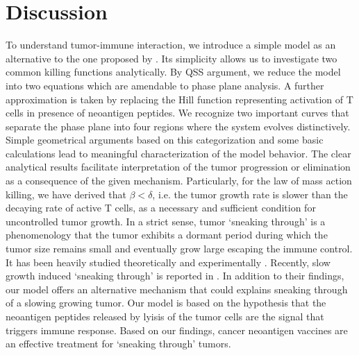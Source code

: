 \documentclass[review,authoryear]{elsarticle}
\begin{document}
\section{Discussion\label{sec:Discussion}}

To understand tumor-immune interaction, we introduce a simple model as
an alternative to the one proposed by \citet{Messan2021}. Its simplicity allows us to investigate two common killing functions analytically. By QSS argument,
we reduce the model into two equations which are amendable to phase
plane analysis. A further approximation is taken by replacing the
Hill function representing activation of T cells in presence of neoantigen
peptides. We recognize two important curves that separate the phase
plane into four regions where the system evolves distinctively. Simple
geometrical arguments based on this categorization and some basic
calculations lead to meaningful characterization of the model behavior.
The clear analytical results facilitate interpretation of the tumor
progression or elimination as a consequence of the given mechanism.
Particularly, for the law of mass action killing, we have derived
that $\beta<\delta$, i.e. the tumor growth rate is slower than the
decaying rate of active T cells, as a necessary and sufficient condition
for uncontrolled tumor growth. In a strict sense, tumor `sneaking through'
is a phenomenology that the tumor exhibits a dormant period during which the
tumor size remains small and eventually grow large escaping the immune control. It has been heavily studied theoretically
and experimentally \citep[see e.g.][for a review]{Wilkie2013}. Recently,
slow growth induced `sneaking through' is reported in \cite{George2018}.
In addition to their findings, our model offers an alternative mechanism
that could explains sneaking through of a slowing growing tumor. Our model is based on the hypothesis that the neoantigen peptides released by lyisis of the tumor cells are the signal that triggers immune response. Based on our findings, cancer neoantigen vaccines are an effective treatment for `sneaking through' tumors.   
\end{document}
